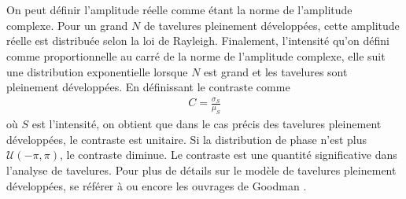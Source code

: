 \documentclass[11pt]{article} %
\begin{document}
\\ \\
On peut définir l'amplitude réelle comme étant la norme de l'amplitude complexe. Pour un grand $N$ de tavelures pleinement développées, cette amplitude réelle est distribuée selon la loi de Rayleigh. Finalement, l'intensité qu'on défini comme proportionnelle au carré de la norme de l'amplitude complexe, elle suit une distribution exponentielle lorsque $N$ est grand et les tavelures sont pleinement développées. En définissant le contraste comme
\begin{align}
C = \frac{\sigma_S}{\mu_S}\label{contraste_base}
\end{align}
où $S$ est l'intensité, on obtient que dans le cas précis des tavelures pleinement développées, le contraste est unitaire. Si la distribution de phase n'est plus $\mathcal{U}(-\pi,\pi)$, le contraste diminue. Le contraste est une quantité significative dans l'analyse de tavelures. Pour plus de détails sur le modèle de tavelures pleinement développées, se référer à \cite{monMemoire} ou encore les ouvrages de Goodman \cite{goodman_speckle_2020, goodman_statistical_2015}.
\end{document}
